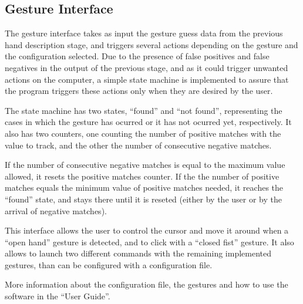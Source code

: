 \subsection{Gesture Interface} 

The gesture interface takes as input the gesture guess data from the previous hand description stage, and triggers several actions depending on the gesture and the configuration selected. Due to the presence of false positives and false negatives in the output of the previous stage, and as it could trigger unwanted actions on the computer, a simple state machine is implemented to assure that the program triggers these actions only when they are desired by the user.

The state machine has two states, ``found'' and ``not found'', representing the cases in which the gesture has ocurred or it has not ocurred yet, respectively. It also has two counters, one counting the number of positive matches with the value to track, and the other the number of consecutive negative matches.

If the number of consecutive negative matches is equal to the maximum value allowed, it resets the positive matches counter. If the the number of positive matches equals the minimum value of positive matches needed, it reaches the ``found'' state, and stays there until it is reseted (either by the user or by the arrival of negative matches). 


This interface allows the user to control the cursor and move it around when a ``open hand'' gesture is detected, and to click with a ``closed fist'' gesture. It also allows to launch two different commands with the remaining implemented gestures, than can be configured with a configuration file.

More information about the configuration file, the gestures and how to use the software in the ``User Guide''. 

\newpage